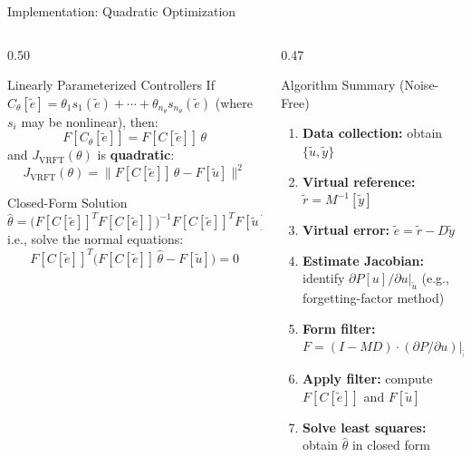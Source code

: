 \documentclass[aspectratio=169]{beamer}
\newcommand{\highlight}[1]{{\color{accentgreen!70!black}\textbf{#1}}}
\newcommand{\JJ}{J_{\mathrm{VRFT}}}
\begin{document}
\begin{frame}{Implementation: Quadratic Optimization}
  \begin{columns}[T]
    \begin{column}{0.50\textwidth}
      \begin{block}{Linearly Parameterized Controllers}
        If $C_\theta[\tilde{e}] = \theta_1 s_1(\tilde{e}) + \cdots + \theta_{n_\theta} s_{n_\theta}(\tilde{e})$
        (where $s_i$ may be nonlinear), then:
        \[
          F[C_\theta[\tilde{e}]] = F[C[\tilde{e}]]\,\theta
        \]
        and $\JJ(\theta)$ is \highlight{quadratic}:
        \[
          \JJ(\theta) = \|F[C[\tilde{e}]]\,\theta - F[\tilde{u}]\|^2
        \]
      \end{block}
      \vspace{0.3em}
      \begin{block}{Closed-Form Solution}
        \[
          \hat\theta = \bigl(F[C[\tilde{e}]]^T F[C[\tilde{e}]]\bigr)^{-1} F[C[\tilde{e}]]^T F[\tilde{u}]
        \]
        i.e., solve the normal equations:
        \[
          F[C[\tilde{e}]]^T\bigl(F[C[\tilde{e}]]\,\hat\theta - F[\tilde{u}]\bigr) = 0
        \]
      \end{block}
    \end{column}
    \begin{column}{0.47\textwidth}
      \begin{exampleblock}{Algorithm Summary (Noise-Free)}
        \begin{enumerate}
          \setlength{\itemsep}{0.4em}
          \item \textbf{Data collection:} obtain $\{\tilde{u}, \tilde{y}\}$
          \item \textbf{Virtual reference:} $\tilde{r} = M^{-1}[\tilde{y}]$
          \item \textbf{Virtual error:} $\tilde{e} = \tilde{r} - D\tilde{y}$
          \item \textbf{Estimate Jacobian:} identify $\partial P[u]/\partial u|_{\tilde{u}}$ (e.g., forgetting-factor method)
          \item \textbf{Form filter:} $F = (I-MD)\cdot(\partial P/\partial u)|_{\tilde{u}}$
          \item \textbf{Apply filter:} compute $F[C[\tilde{e}]]$ and $F[\tilde{u}]$
          \item \textbf{Solve least squares:} obtain $\hat\theta$ in closed form
        \end{enumerate}
      \end{exampleblock}
    \end{column}
  \end{columns}
\end{frame}
\end{document}
